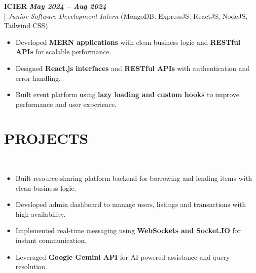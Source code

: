 \documentclass[10pt,a4paper]{article}
\begin{document}
\vspace{5pt}
\noindent
   \textbf{ICIER} \hfill \textit{\textbf{May 2024 -- Aug 2024}} \\
  \;|\;
  \textit{Junior Software Development Intern} (MongoDB, ExpressJS, ReactJS, NodeJS, Tailwind CSS)
  \hfill

\begin{itemize}



\item Developed \textbf{MERN applications} with clean business logic and \textbf{RESTful APIs} for scalable performance.



\item Designed \textbf{React.js interfaces} and \textbf{RESTful APIs} with authentication and error handling.



\item Built event platform using \textbf{lazy loading and custom hooks} to improve performance and user experience.



\end{itemize}
\section*{PROJECTS}
\small

\noindent
{}\\[-12pt]
\begin{itemize}

\item Built resource-sharing platform backend for borrowing and lending items with clean business logic.

\item Developed admin dashboard to manage users, listings and transactions with high availability.

\item Implemented real-time messaging using \textbf{WebSockets and Socket.IO} for instant communication.

\item Leveraged \textbf{Google Gemini API} for AI-powered assistance and query resolution.

\end{itemize}
\end{document}
